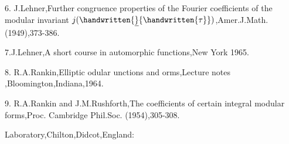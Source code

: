 6. J.Lehner,Further congruence properties of the Fourier coefficients of the modular invariant $j(\handwritten{\underline}{\handwritten{\tau}})$,Amer.J.Math.(1949),373-386.

7.J.Lehner,A short course in automorphic functions,New York 1965.

8. R.A.Rankin,Elliptic odular unctions and orms,Lecture notes ,Bloomington,Indiana,1964.

9. R.A.Rankin and J.M.Rushforth,The coefficients of certain integral modular forms,Proc. Cambridge Phil.Soc. (1954),305-308.\margin{\handwritten{\#}}

   Laboratory,Chilton,Didcot,England:
